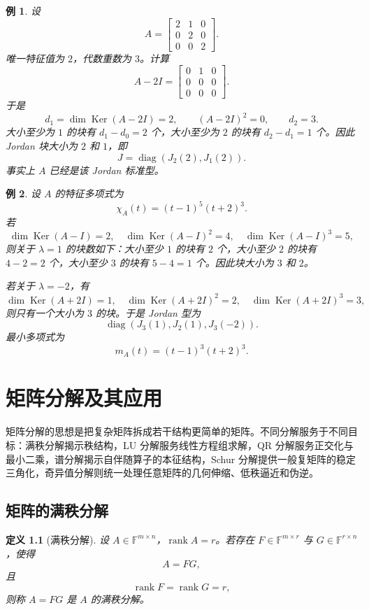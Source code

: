 \documentclass[UTF8,openany,zihao=-4]{ctexbook}
\theoremstyle{cnplain}
\newtheorem{definition}{定义}[chapter]
\newtheorem{example}{例}[chapter]
\newcommand{\F}{\mathbb F}
\newcommand{\rank}{\operatorname{rank}}
\newcommand{\Ker}{\operatorname{Ker}}
\newcommand{\diag}{\operatorname{diag}}
\begin{document}
\begin{example}
设
\[
A=
\begin{bmatrix}
2&1&0\\
0&2&0\\
0&0&2
\end{bmatrix}.
\]
唯一特征值为 $2$，代数重数为 $3$。计算
\[
A-2I=
\begin{bmatrix}
0&1&0\\
0&0&0\\
0&0&0
\end{bmatrix}.
\]
于是
\[
d_1=\dim\Ker(A-2I)=2,
\qquad
(A-2I)^2=0,
\qquad d_2=3.
\]
大小至少为 $1$ 的块有 $d_1-d_0=2$ 个，大小至少为 $2$ 的块有 $d_2-d_1=1$ 个。因此 Jordan 块大小为 $2$ 和 $1$，即
\[
J=\diag(J_2(2),J_1(2)).
\]
事实上 $A$ 已经是该 Jordan 标准型。
\end{example}

\begin{example}
设 $A$ 的特征多项式为
\[
\chi_A(t)=(t-1)^5(t+2)^3.
\]
若
\[
\dim\Ker(A-I)=2,
\quad
\dim\Ker(A-I)^2=4,
\quad
\dim\Ker(A-I)^3=5,
\]
则关于 $\lambda=1$ 的块数如下：大小至少 $1$ 的块有 $2$ 个，大小至少 $2$ 的块有 $4-2=2$ 个，大小至少 $3$ 的块有 $5-4=1$ 个。因此块大小为 $3$ 和 $2$。

若关于 $\lambda=-2$，有
\[
\dim\Ker(A+2I)=1,
\quad
\dim\Ker(A+2I)^2=2,
\quad
\dim\Ker(A+2I)^3=3,
\]
则只有一个大小为 $3$ 的块。于是 Jordan 型为
\[
\diag(J_3(1),J_2(1),J_3(-2)).
\]
最小多项式为
\[
m_A(t)=(t-1)^3(t+2)^3.
\]
\end{example}

\chapter{矩阵分解及其应用}

矩阵分解的思想是把复杂矩阵拆成若干结构更简单的矩阵。不同分解服务于不同目标：满秩分解揭示秩结构，LU 分解服务线性方程组求解，QR 分解服务正交化与最小二乘，谱分解揭示自伴随算子的本征结构，Schur 分解提供一般复矩阵的稳定三角化，奇异值分解则统一处理任意矩阵的几何伸缩、低秩逼近和伪逆。

\section{矩阵的满秩分解}

\begin{definition}[满秩分解]
设 $A\in\F^{m\times n}$，$\rank A=r$。若存在 $F\in\F^{m\times r}$ 与 $G\in\F^{r\times n}$，使得
\[
A=FG,
\]
且
\[
\rank F=\rank G=r,
\]
则称 $A=FG$ 是 $A$ 的满秩分解。
\end{definition}
\end{document}
